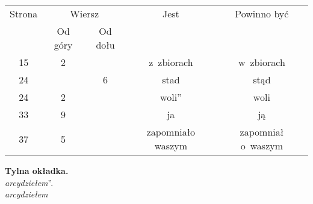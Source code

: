 \documentclass[a4paper,11pt]{article}
\begin{document}
\begin{center}

  \begin{tabular}{|c|c|c|c|c|}
    \hline
    Strona & \multicolumn{2}{c|}{Wiersz} & Jest
                              & Powinno być \\ \cline{2-3}
    & Od góry & Od dołu & & \\
    \hline
    15  &  2 & & z~zbiorach & w~zbiorach \\
    24  & &  6 & stad & stąd \\
    24  &  2 & & woli” & woli \\
    33  &  9 & & ja & ją \\
    37  &  5 & & zapomniało waszym & zapomniał o~waszym \\
    \hline
  \end{tabular}

\end{center}

\vspace{\spaceTwo}


\noindent
\textbf{Tylna okładka.} \\
\Jest  \textit{arcydziełem}”. \\
\Powin \textit{arcydziełem} \\















\vspace{\spaceFive}
\end{document}
